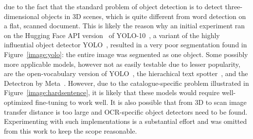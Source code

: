 \documentclass[english,twoside,openright]{UH_DS_MSc}
\begin{document}
due to the fact that the standard problem of object detection is to detect three-dimensional objects in 3D scenes, which is 
quite different from word detection on a flat, scanned document. This is likely the reason why an initial experiment 
ran on the Hugging Face API version~\cite{OmouredYOLOv10DocumentLayoutAnalysisHugging2023} of YOLO-10~\cite{wang2024yolov10}, a variant of the highly influential object detector YOLO~\cite{redmonYouOnlyLook2016},
resulted in a very poor segmentation found in Figure~\ref{image:yolo}: the entire image was segmented as one object.
Some possibly more applicable models, however not as easily testable due to lesser popularity, 
are the open-vocabulary version of YOLO~\cite{YOLOWorldRealTimeOpenVocabulary},
 the hierachical text spotter~\cite{longHierarchicalTextSpotter2024}, and the Detectron by Meta~\cite{Detectron}.
 However, due to the catalogue-specific problem illustrated in Figure~\ref{image:hardsentence}, it is likely that these 
 models would require well-optimized fine-tuning to work well. It is also possible that from 3D to scan image transfer distance is 
 too large and OCR-specific object detectors need to be found. Experimenting with such implementations is a 
 substantial effort and was omitted from this work to keep the scope reasonable.
\end{document}
